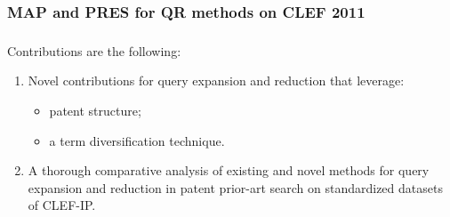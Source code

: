 \documentclass[xcolor=x11names,compress]{beamer}
\renewcommand{\(}{\begin{columns}}
\renewcommand{\)}{\end{columns}}
\newcommand{\<}[1]{\begin{column}{#1}}
\renewcommand{\>}{\end{column}}
\begin{document}
\begin{frame}
\frametitle{MAP and PRES for QR methods on CLEF 2011}






\end{frame}




\begin{frame}
\frametitle{}

Contributions are the following: 
\begin{enumerate}
\item Novel contributions for query expansion and reduction that leverage:
	\begin{itemize} 
	\item patent structure;
	\item a term diversification technique. 
	\end{itemize}
\item A thorough comparative analysis of existing and novel methods for
query expansion and reduction in patent prior-art search on standardized
datasets of CLEF-IP. 
\end{enumerate}
\end{frame}
\end{document}
